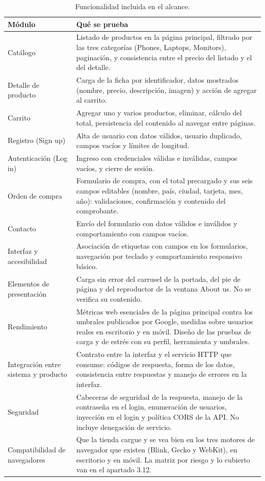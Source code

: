 \documentclass[11pt,a4paper]{article}
\begin{document}
\begingroup
\small
\renewcommand{\arraystretch}{1.2}
\begin{table}[htb]\centering\small
\caption{Funcionalidad incluida en el alcance.}\label{tab:alcance}
\begin{tabularx}{\textwidth}{@{}L{3.6cm} Y@{}}
\toprule
\textbf{Módulo} & \textbf{Qué se prueba} \\
\midrule
Catálogo & Listado de productos en la página principal, filtrado por las tres categorías (Phones, Laptops, Monitors), paginación, y consistencia entre el precio del listado y el del detalle. \\
Detalle de producto & Carga de la ficha por identificador, datos mostrados (nombre, precio, descripción, imagen) y acción de agregar al carrito. \\
Carrito & Agregar uno y varios productos, eliminar, cálculo del total, persistencia del contenido al navegar entre páginas. \\
Registro (Sign up) & Alta de usuario con datos válidos, usuario duplicado, campos vacíos y límites de longitud. \\
Autenticación (Log in) & Ingreso con credenciales válidas e inválidas, campos vacíos, y cierre de sesión. \\
Orden de compra & Formulario de compra, con el total precargado y sus seis campos editables (nombre, país, ciudad, tarjeta, mes, año): validaciones, confirmación y contenido del comprobante. \\
Contacto & Envío del formulario con datos válidos e inválidos y comportamiento con campos vacíos. \\
Interfaz y accesibilidad & Asociación de etiquetas con campos en los formularios, navegación por teclado y comportamiento responsivo básico. \\
Elementos de presentación & Carga sin error del carrusel de la portada, del pie de página y del reproductor de la ventana About us. No se verifica su contenido. \\
Rendimiento & Métricas web esenciales de la página principal contra los umbrales publicados por Google, medidas sobre usuarios reales en escritorio y en móvil. Diseño de las pruebas de carga y de estrés con su perfil, herramienta y umbrales. \\
Integración entre sistema y producto & Contrato entre la interfaz y el servicio HTTP que consume: códigos de respuesta, forma de los datos, consistencia entre respuestas y manejo de errores en la interfaz. \\
Seguridad & Cabeceras de seguridad de la respuesta, manejo de la contraseña en el login, enumeración de usuarios, inyección en el login y política CORS de la API. No incluye denegación de servicio. \\
Compatibilidad de navegadores & Que la tienda cargue y se vea bien en los tres motores de navegador que existen (Blink, Gecko y WebKit), en escritorio y en móvil. La matriz por riesgo y lo cubierto van en el apartado 3.12. \\
\bottomrule
\end{tabularx}
\end{table}
\endgroup
\end{document}
